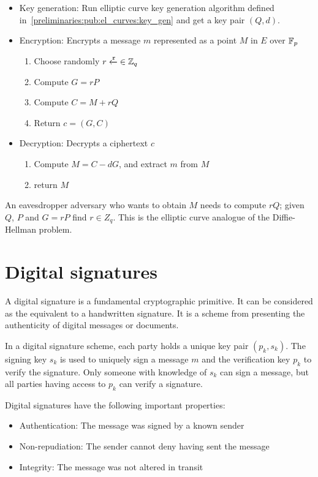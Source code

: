 \begin{itemize}
  \item Key generation: Run elliptic curve key generation algorithm defined in~\ref{preliminaries:pub:el_curves:key_gen} and get a key pair $(Q, d)$.
  \item Encryption: Encrypts a message $m$ represented as a point $M$ in $E$ over $\mathbb{F}_p$
    \begin{enumerate}
      \item Choose randomly $r \xleftarrow{\mathtt{r}}{\in \mathbb{Z}_q}$
      \item Compute $G = rP$
      \item Compute $C = M + rQ$
      \item Return $c = (G, C)$
    \end{enumerate}
  \item Decryption: Decrypts a ciphertext $c$
    \begin{enumerate}
      \item Compute $M = C - dG$, and extract $m$ from $M$
      \item return $M$
    \end{enumerate}
\end{itemize}

An eavesdropper adversary who wants to obtain $M$ needs to compute $rQ$; given $Q$, $P$ and $G = rP$ find $r \in Z_q$. This is the elliptic curve analogue of the Diffie-Hellman problem.

\section{Digital signatures}
\label{preliminaries:sign}

A digital signature is a fundamental cryptographic primitive. It can be considered as the equivalent to a handwritten signature. It is a scheme from presenting the authenticity of digital messages or documents.

In a digital signature scheme, each party holds a unique key pair $(p_k, s_k)$. The signing key $s_k$ is used to uniquely sign a message $m$ and the verification key $p_k$ to verify the signature. Only someone with knowledge of $s_k$ can sign a message, but all parties having access to $p_k$ can verify a signature.

Digital signatures have the following important properties:

\begin{itemize}
  \item Authentication: The message was signed by a known sender
  \item Non-repudiation: The sender cannot deny having sent the message
  \item Integrity: The message was not altered in transit
\end{itemize}

